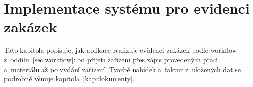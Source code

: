 \chapter{Implementace systému pro evidenci zakázek}\label{kap:funkce}

Tato kapitola popisuje, jak aplikace realizuje evidenci zakázek podle workflow z~oddílu~\ref{sec:workflow}: od přijetí zařízení přes zápis provedených prací a~materiálu až po vydání zařízení. Tvorbě nabídek a~faktur z~uložených dat se podrobně věnuje kapitola~\ref{kap:dokumenty}.

\begingroup\sloppy

\endgroup
